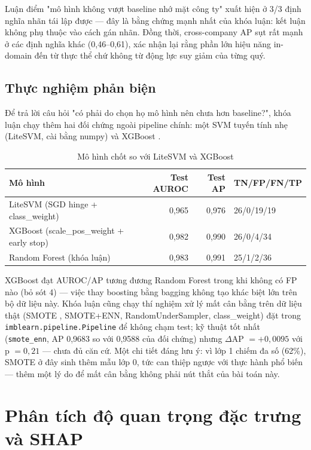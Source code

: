 Luận điểm "mô hình không vượt baseline nhớ mặt công ty" xuất hiện ở 3/3 định nghĩa nhãn tái lập được
— đây là bằng chứng mạnh nhất của khóa luận: kết luận không phụ thuộc vào cách gán nhãn. Đồng thời,
cross-company AP sụt rất mạnh ở các định nghĩa khác (0,46--0,61), xác nhận lại rằng phần lớn hiệu
năng in-domain đến từ thực thể chứ không từ động lực suy giảm của từng quý.

\subsection{Thực nghiệm phản biện}

Để trả lời câu hỏi "có phải do chọn họ mô hình nên chưa hơn baseline?", khóa luận chạy thêm hai đối
chứng ngoài pipeline chính: một SVM tuyến tính nhẹ (LiteSVM, cài bằng numpy) và XGBoost
\cite{chen2016}.

\begin{table}[H]
\centering
\caption{Mô hình chốt so với LiteSVM và XGBoost}
\label{tab:defense}
\begin{tabular}{|l|r|r|l|}
\hline
\textbf{Mô hình} & \textbf{Test AUROC} & \textbf{Test AP} & \textbf{TN/FP/FN/TP} \\
\hline
LiteSVM (SGD hinge + class\_weight) & 0,965 & 0,976 & 26/0/19/19 \\
XGBoost (scale\_pos\_weight + early stop) & 0,982 & 0,990 & 26/0/4/34 \\
Random Forest (khóa luận) & 0,983 & 0,991 & 25/1/2/36 \\
\hline
\end{tabular}
\end{table}

XGBoost đạt AUROC/AP tương đương Random Forest trong khi không có FP nào (bỏ sót 4) — việc thay
boosting bằng bagging không tạo khác biệt lớn trên bộ dữ liệu này. Khóa luận cũng chạy thí nghiệm xử
lý mất cân bằng trên dữ liệu thật (SMOTE \cite{chawla2002}, SMOTE+ENN, RandomUnderSampler,
class\_weight) đặt trong \texttt{imblearn.pipeline.Pipeline} \cite{lemaitre2017} để không chạm test;
kỹ thuật tốt nhất (\texttt{smote\_enn}, AP 0,9683 so với 0,9588 của đối chứng) nhưng $\Delta$AP
$= +0{,}0095$ với p $= 0{,}21$ — chưa đủ căn cứ. Một chi tiết đáng lưu ý: vì lớp 1 chiếm đa số
(62\%), SMOTE ở đây sinh thêm mẫu lớp 0, tức can thiệp ngược với thực hành phổ biến — thêm một lý do
để mất cân bằng không phải nút thắt của bài toán này.

\section{Phân tích độ quan trọng đặc trưng và SHAP}

